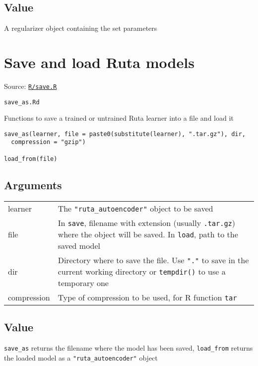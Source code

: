 \hypertarget{value}{\subsection{\texorpdfstring{\protect\hyperlink{value}{}Value}{Value}}\label{value}}

A regularizer object containing the set parameters

\section{Save and load Ruta models}\label{save-and-load-ruta-models}

Source:
\href{https://github.com/fdavidcl/ruta/blob/master/R/save.R}{\texttt{R/save.R}}

\texttt{save\_as.Rd}

Functions to save a trained or untrained Ruta learner into a file and
load it

\begin{verbatim}
save_as(learner, file = paste0(substitute(learner), ".tar.gz"), dir,
  compression = "gzip")

load_from(file)
\end{verbatim}

\hypertarget{arguments}{\subsection{\texorpdfstring{\protect\hyperlink{arguments}{}Arguments}{Arguments}}\label{arguments}}

\begin{longtable}[c]{@{}ll@{}}
\toprule
learner & The \texttt{"ruta\_autoencoder"} object to be
saved\tabularnewline
file & In \texttt{save}, filename with extension (usually
\texttt{.tar.gz}) where the object will be saved. In \texttt{load}, path
to the saved model\tabularnewline
dir & Directory where to save the file. Use \texttt{"."} to save in the
current working directory or \texttt{tempdir()} to use a temporary
one\tabularnewline
compression & Type of compression to be used, for R function
\texttt{tar}\tabularnewline
\bottomrule
\end{longtable}

\hypertarget{value}{\subsection{\texorpdfstring{\protect\hyperlink{value}{}Value}{Value}}\label{value}}

\texttt{save\_as} returns the filename where the model has been saved,
\texttt{load\_from} returns the loaded model as a
\texttt{"ruta\_autoencoder"} object


